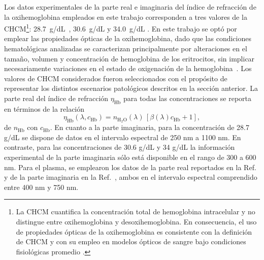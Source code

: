 Los datos experimentales de la parte real e imaginaria del índice de refracción de la oxihemoglobina empleados en este trabajo corresponden a tres valores de la CHCM\footnote{La CHCM cuantifica la concentración total de hemoglobina intracelular y no distingue entre oxihemoglobina y desoxihemoglobina. En consecuencia, el uso de propiedades ópticas de la oxihemoglobina es consistente con la definición de CHCM y con su empleo en modelos ópticos de sangre bajo condiciones fisiológicas promedio \cite{bosschaartLiteratureReviewNovel2014}.}: 28.7~g/dL~\cite{friebelModelFunctionCalculate2006}, 30.6~g/dL \cite{friebelDeterminationComplexRefractive2005} y 34.0~g/dL \cite{friebelDeterminationComplexRefractive2005}. En este trabajo se optó por emplear las propiedades ópticas de la oxihemoglobina, dado que las condiciones hematológicas analizadas se caracterizan principalmente por alteraciones en el tamaño, volumen y concentración de hemoglobina de los eritrocitos, sin implicar necesariamente variaciones en el estado de oxigenación de la hemoglobina~\cite{keohaneRodaksHematologyClinical2015}. Los valores de CHCM considerados fueron seleccionados con el propósito de representar los distintos escenarios patológicos descritos en la sección anterior. La parte real del índice de refracción $\eta_{\text{Hb}}$ para todas las concentraciones se reporta en términos de la relación \cite{friebelModelFunctionCalculate2006}
%
\begin{equation}
	\eta_{\text{Hb}}(\lambda,c_{\text{Hb}})=n_{\text{H}_{2}\text{O}}(\lambda)\,[\beta(\lambda)c_{\text{Hb}}+1],
	\label{eq:IR_eri}
\end{equation}
%
 de $n_{\text{Hb}}$ con $c_{\text{Hb}}$. En cuanto a la parte imaginaria, para la concentración de 28.7 g/dL se dispone de datos en el intervalo espectral de 250 nm a 1100 nm. En contraste, para las concentraciones de 30.6 g/dL y 34 g/dL la información experimental de la parte imaginaria sólo está disponible en el rango de 300 a 600 nm. Para el plasma, se emplearon los datos de la parte real reportados en la Ref. \cite{liuMeasurementRefractiveIndex2019} y de la parte imaginaria en la Ref.~\cite{meinkeOpticalPropertiesPlatelets2007}, ambos en el intervalo espectral comprendido entre 400 nm y 750 nm.
